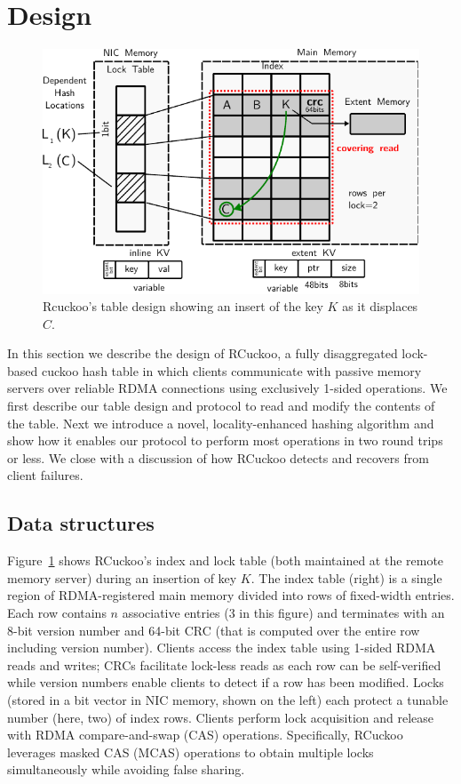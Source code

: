 \section{Design}
\label{sec:design}

\begin{figure}[t]
    \includegraphics[width=0.99\linewidth]{fig/table-diagram.pdf}
    \caption{Rcuckoo's table design showing an insert of the key $K$ as it displaces $C$.~}
    \label{fig:table-diagram}
\end{figure}

In this section we describe the design of RCuckoo, a fully
disaggregated lock-based cuckoo hash table in which clients
communicate with passive memory servers over reliable RDMA connections
using exclusively 1-sided operations.  We first describe our table
design and protocol to read and modify the contents of the table.
Next we introduce a novel, locality-enhanced hashing algorithm and show
how it enables our protocol to perform most operations in two round
trips or less.  We close with a discussion of how RCuckoo detects and
recovers from client failures.

\subsection{Data structures}
\label{sec:table-design}

Figure~\ref{fig:table-diagram} shows RCuckoo's index and lock table
(both maintained at the remote memory server) during an insertion of
key $K$.  The index table (right) is a single region of
RDMA-registered main memory divided into rows of fixed-width entries.
Each row contains $n$ associative entries (3 in this figure) and
terminates with an 8-bit version number and 64-bit CRC (that is
computed over the entire row including version number).  Clients
access the index table using 1-sided RDMA reads and writes; CRCs
facilitate lock-less reads as each row can be self-verified while
version numbers enable clients to detect if a row has been modified.
Locks (stored in a bit vector in NIC memory, shown on the left) each
protect a tunable number (here, two) of index rows.  Clients perform
lock acquisition and release with RDMA compare-and-swap (CAS)
operations.  Specifically, RCuckoo leverages masked CAS (MCAS)
operations to obtain multiple locks simultaneously while avoiding
false sharing.

